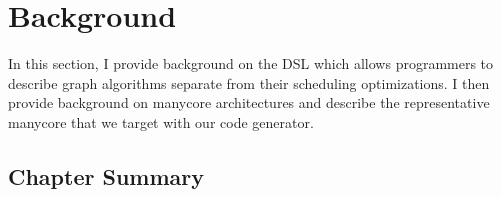 \chapter{Background}\label{gen:sec:background}

In this section, I provide background on the \graphit DSL which allows programmers to describe graph algorithms separate from their scheduling optimizations.
I then provide background on manycore architectures and describe the representative manycore that we target with our code generator. 







\section{Chapter Summary}